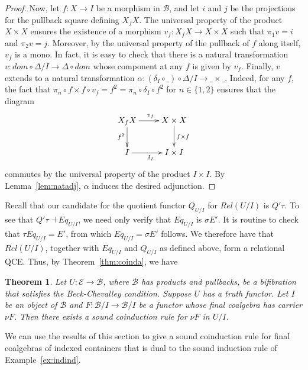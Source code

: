 \documentclass{LMCS}
\newcommand{\ra}{\rightarrow}
\newcommand\E{{\mathcal E}}
\newcommand\B{{\mathcal B}}
\newcommand\ti{\!\times\!}
\theoremstyle{plain}
\newtheorem{theorem}{Theorem}[section]
\theoremstyle{remark}
\theoremstyle{definition}
\begin{document}
\begin{proof}
  Now, let $f:X \ra I$ be a morphism in $\B$, and let $i$ and $j$ be
  the projections for the pullback square defining $X_f X$. The
  universal property of the product $X \times X$ ensures the existence
  of a morphism $v_f : X_fX \to X \times X$ such that $\pi_1 v = i$
  and $\pi_2 v = j$.  Moreover, by the universal property of the
  pullback of $f$ along itself, $v_f$ is a mono. In fact, it is easy
  to check that there is a natural transformation $v:dom\circ
  \Delta/I\to \Delta\circ dom$ whose component at any $f$ is given by
  $v_f$.  Finally, $v$ extends to a natural transformation $\alpha :
  (\delta_I\circ\_)\circ \Delta/I \to \_\times \_$. Indeed, for any
  $f$, the fact that $\pi_n\circ f\ti f\circ v_f = f^2 = \pi_n\circ
  \delta_I\circ f^2$ for $n\in\{1,2\}$ ensures that the diagram
  \[\xymatrix{
    X_fX \ar[d]_{f^2} \ar[r]^{v_f} & X\times X \ar[d]^{f\times f}\\
    I \ar[r]_{\delta_I} & I\times I}
  \]
  commutes by the universal property of the product $I\times I$.  By
  Lemma~\ref{lem:natadj}, $\alpha$ induces the desired adjunction.
\end{proof}

Recall that our candidate for the quotient functor $Q_{U/I}$ for
$Rel(U/I)$ is $Q'\tau$. To see that $Q'\tau \dashv Eq_{U/I}$, we need
only verify that $Eq_{U/I}$ is $\sigma E'$. It is routine to check
that $\tau Eq_{U/I} = E'$, from which $Eq_{U/I} = \sigma E'$
follows. We therefore have that $Rel(U/I)$, together with 
$Eq_{U/I}$ and $Q_{U/I}$ as defined above, form a relational
QCE. Thus, by Theorem~\ref{thm:coinda}, we have 

\begin{theorem}\label{thm:icoinda}
  Let $U :\E \to \B$, where $\B$ has products and pullbacks, be a
  bifibration that satisfies the Beck-Chevalley condition. Suppose $U$
  has a truth functor. Let $I$ be an object of $\B$ and $F : \B/I \to
  \B/I$ be a functor whose final coalgebra has carrier $\nu F$. Then
  there exists a sound coinduction rule for $\nu F$ in $U/I$.
\end{theorem}

We can use the results of this section to give a sound coinduction rule
for final coalgebras of indexed containers that is dual to the
sound induction rule of Example~\ref{ex:indind}.
\end{document}
